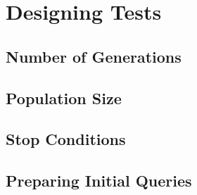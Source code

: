 
\chapter{Designing Tests} \label{chap:DesigningTests}

\section{Number of Generations}
\section{Population Size}
\section{Stop Conditions}
\section{Preparing Initial Queries}

